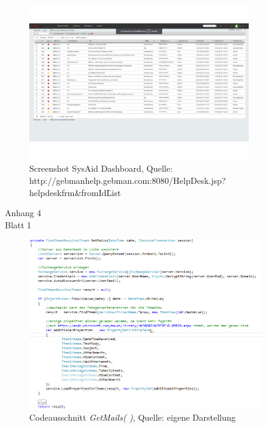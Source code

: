 \begin{figure}[h!]
\includegraphics[width=0.85\textwidth]{Abbildungen/SysAid.pdf}
\caption*{Screenshot SysAid Dashboard, \newline
Quelle: http://gebmanhelp.gebman.com:8080/HelpDesk.jsp?helpdeskfrm\&fromId\=List}
\label{SysAid}
\end{figure}

\newpage


\begin{flushright}
Anhang 4\\
Blatt 1\\
\label{Anhang4}
\end{flushright}


\begin{figure}[h!]
\includegraphics[width=0.9\textwidth]{Abbildungen/Codeausschnitt.png}
	\caption*{Codeausschnitt \textit{GetMails( )}, Quelle: eigene Darstellung}
	\label{Codeausschnitt}
\end{figure}







